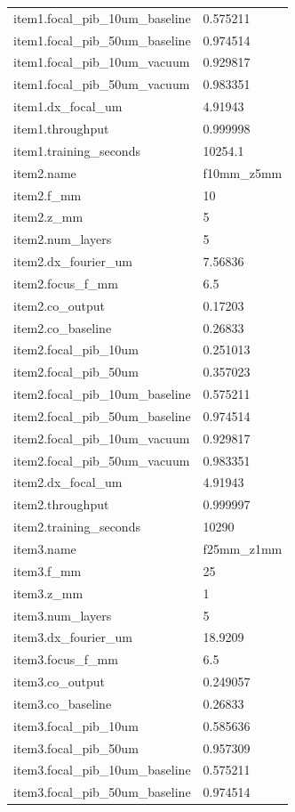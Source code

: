 \begin{longtable}{p{}p{}}
item1.focal\_pib\_10um\_baseline & 0.575211\\
item1.focal\_pib\_50um\_baseline & 0.974514\\
item1.focal\_pib\_10um\_vacuum & 0.929817\\
item1.focal\_pib\_50um\_vacuum & 0.983351\\
item1.dx\_focal\_um & 4.91943\\
item1.throughput & 0.999998\\
item1.training\_seconds & 10254.1\\
item2.name & f10mm\_z5mm\\
item2.f\_mm & 10\\
item2.z\_mm & 5\\
item2.num\_layers & 5\\
item2.dx\_fourier\_um & 7.56836\\
item2.focus\_f\_mm & 6.5\\
item2.co\_output & 0.17203\\
item2.co\_baseline & 0.26833\\
item2.focal\_pib\_10um & 0.251013\\
item2.focal\_pib\_50um & 0.357023\\
item2.focal\_pib\_10um\_baseline & 0.575211\\
item2.focal\_pib\_50um\_baseline & 0.974514\\
item2.focal\_pib\_10um\_vacuum & 0.929817\\
item2.focal\_pib\_50um\_vacuum & 0.983351\\
item2.dx\_focal\_um & 4.91943\\
item2.throughput & 0.999997\\
item2.training\_seconds & 10290\\
item3.name & f25mm\_z1mm\\
item3.f\_mm & 25\\
item3.z\_mm & 1\\
item3.num\_layers & 5\\
item3.dx\_fourier\_um & 18.9209\\
item3.focus\_f\_mm & 6.5\\
item3.co\_output & 0.249057\\
item3.co\_baseline & 0.26833\\
item3.focal\_pib\_10um & 0.585636\\
item3.focal\_pib\_50um & 0.957309\\
item3.focal\_pib\_10um\_baseline & 0.575211\\
item3.focal\_pib\_50um\_baseline & 0.974514\\

\end{longtable}
